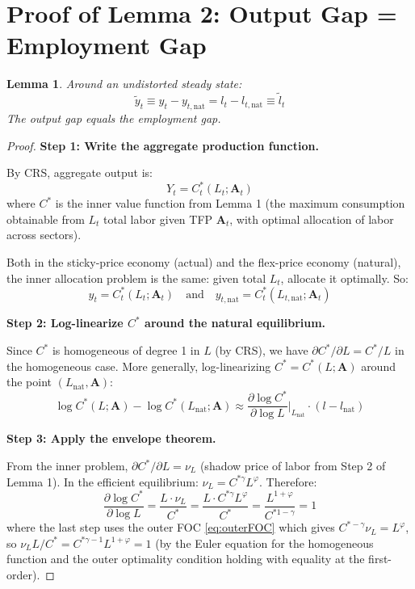 \documentclass[12pt]{article}
\newtheorem{lemma}{Lemma}
\begin{document}
\section{Proof of Lemma 2: Output Gap = Employment Gap}

\begin{lemma}
Around an undistorted steady state:
\begin{equation}
    \tilde{y}_t \equiv y_t - y_{t,\mathrm{nat}} = l_t - l_{t,\mathrm{nat}} \equiv \tilde{l}_t
\end{equation}
The output gap equals the employment gap.
\end{lemma}

\begin{proof}
\textbf{Step 1: Write the aggregate production function.}

By CRS, aggregate output is:
\begin{equation}
    Y_t = C_t^*(L_t; \mathbf{A}_t)
\end{equation}
where $C^*$ is the inner value function from Lemma 1 (the maximum consumption obtainable from $L_t$ total labor given TFP $\mathbf{A}_t$, with optimal allocation of labor across sectors).

Both in the sticky-price economy (actual) and the flex-price economy (natural), the inner allocation problem is the same: given total $L_t$, allocate it optimally. So:
\begin{equation}
    y_t = C_t^*(L_t; \mathbf{A}_t) \quad \text{and} \quad y_{t,\mathrm{nat}} = C_t^*(L_{t,\mathrm{nat}}; \mathbf{A}_t)
\end{equation}

\medskip
\textbf{Step 2: Log-linearize $C^*$ around the natural equilibrium.}

Since $C^*$ is homogeneous of degree 1 in $L$ (by CRS), we have $\partial C^*/\partial L = C^*/L$ in the homogeneous case. More generally, log-linearizing $C^* = C^*(L; \mathbf{A})$ around the point $(L_{\mathrm{nat}}, \mathbf{A})$:
\begin{equation}
    \log C^*(L; \mathbf{A}) - \log C^*(L_{\mathrm{nat}}; \mathbf{A}) \approx \frac{\partial \log C^*}{\partial \log L}\bigg|_{L_{\mathrm{nat}}} \cdot (l - l_{\mathrm{nat}})
\end{equation}

\medskip
\textbf{Step 3: Apply the envelope theorem.}

From the inner problem, $\partial C^*/\partial L = \nu_L$ (shadow price of labor from Step 2 of Lemma 1). In the efficient equilibrium: $\nu_L = C^{*\gamma} L^\varphi$. Therefore:
\begin{equation}
    \frac{\partial \log C^*}{\partial \log L} = \frac{L \cdot \nu_L}{C^*} = \frac{L \cdot C^{*\gamma} L^\varphi}{C^*} = \frac{L^{1+\varphi}}{C^{*1-\gamma}} = 1
\end{equation}
where the last step uses the outer FOC \eqref{eq:outerFOC} which gives $C^{*-\gamma}\nu_L = L^\varphi$, so $\nu_L L/C^* = C^{*\gamma-1}L^{1+\varphi} = 1$ (by the Euler equation for the homogeneous function and the outer optimality condition holding with equality at the first-order).


\end{proof}
\end{document}
